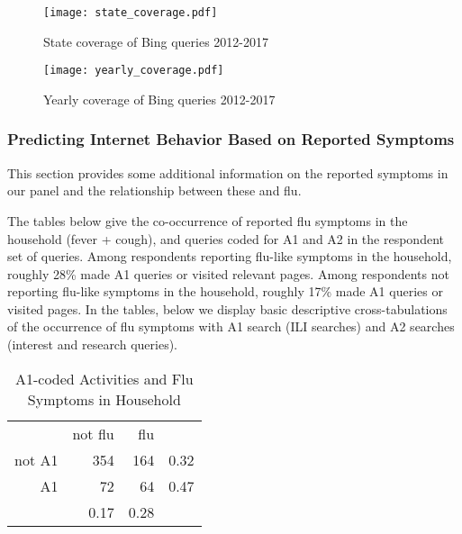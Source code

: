 \documentclass[12pt]{article}
\begin{document}
\begin{figure}[!htbp]
\begin{centering}
   \texttt{[image: state\_coverage.pdf]}
  \caption{State coverage of Bing queries 2012-2017}
\label{state_coverage}
\end{centering}
\end{figure}

\begin{figure}[!htbp]
\begin{centering}
   \texttt{[image: yearly\_coverage.pdf]}
  \caption{Yearly coverage of Bing queries 2012-2017}
\label{year_coverage}
\end{centering}
\end{figure}

\subsubsection{Predicting Internet Behavior Based on Reported Symptoms}

This section provides some additional information on the reported symptoms in our panel and the relationship between these and flu.


The tables below give the co-occurrence of reported flu symptoms in the household (fever + cough), and queries coded for A1 and A2 in the respondent set of queries. Among respondents reporting flu-like symptoms in the household, roughly 28\% made A1 queries or visited relevant pages. Among respondents not reporting flu-like symptoms in the household, roughly 17\% made A1 queries or visited pages. In the tables, below we display basic descriptive cross-tabulations of the occurrence of flu symptoms with A1 search (ILI searches) and A2 searches (interest and research queries).

\begin{table}[!htbp]
\centering
  \caption{A1-coded Activities and Flu Symptoms in Household} 
  \label{descript3} 
\begin{tabular}{rrrr}
  \hline
    & not flu &  flu & \\
not A1 & 354 & 164 & 0.32\\
A1 & 72 & 64 & 0.47 \\
   \hline
   & 0.17 & 0.28 &  \\
   \hline
\end{tabular}
\end{table}
\end{document}

